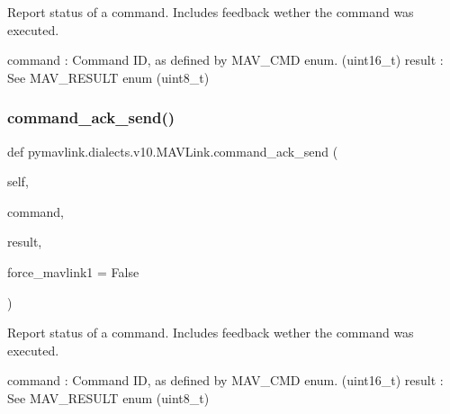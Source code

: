 \begin{DoxyVerb}
\begin{DoxyVerb}
\begin{DoxyVerb}Report status of a command. Includes feedback wether the command was
executed.

command                   : Command ID, as defined by MAV_CMD enum. (uint16_t)
result                    : See MAV_RESULT enum (uint8_t)\end{DoxyVerb}
 \mbox{\label{classpymavlink_1_1dialects_1_1v10_1_1MAVLink_a12e481b4a0f515626fdb12b5b3e1d809}} 
\subsubsection{\texorpdfstring{command\+\_\+ack\+\_\+send()}{command\_ack\_send()}}
{\footnotesize\ttfamily def pymavlink.\+dialects.\+v10.\+M\+A\+V\+Link.\+command\+\_\+ack\+\_\+send (\begin{DoxyParamCaption}\item[{}]{self,  }\item[{}]{command,  }\item[{}]{result,  }\item[{}]{force\+\_\+mavlink1 = {\ttfamily False} }\end{DoxyParamCaption})}

\begin{DoxyVerb}Report status of a command. Includes feedback wether the command was
executed.

command                   : Command ID, as defined by MAV_CMD enum. (uint16_t)
result                    : See MAV_RESULT enum (uint8_t)\end{DoxyVerb}
 \mbox{\label{classpymavlink_1_1dialects_1_1v10_1_1MAVLink_ae60d7b66dfbd93f871983e4d0f97c3bc}} 

\end{DoxyVerb}
\end{DoxyVerb}
